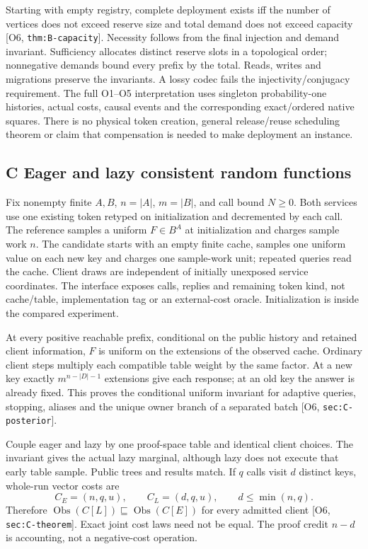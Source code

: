 \documentclass[11pt,a4paper]{article}
\theoremstyle{definition}
\newcommand{\Obs}{\operatorname{Obs}}
\newcommand{\Addr}[2]{\textup{[#1, \texttt{#2}]}}
\begin{document}
Starting with empty registry, complete deployment exists iff the number
of vertices does not exceed reserve size and total demand does not exceed
capacity \Addr{O6}{thm:B-capacity}. Necessity follows from the final
injection and demand invariant. Sufficiency allocates distinct reserve
slots in a topological order; nonnegative demands bound every prefix by
the total. Reads, writes and migrations preserve the invariants. A lossy
codec fails the injectivity/conjugacy requirement. The full O1--O5
interpretation uses singleton probability-one histories, actual costs,
causal events and the corresponding exact/ordered native squares. There
is no physical token creation, general release/reuse scheduling theorem
or claim that compensation is needed to make deployment an instance.

\subsection{C Eager and lazy consistent random functions}
Fix nonempty finite \(A,B\), \(n=|A|\), \(m=|B|\), and call bound
\(N\ge0\). Both services use one existing token retyped on initialization
and decremented by each call. The reference samples a uniform
\(F\in B^A\) at initialization and charges sample work \(n\). The
candidate starts with an empty finite cache, samples one uniform value
on each new key and charges one sample-work unit; repeated queries read
the cache. Client draws are independent of initially unexposed service
coordinates. The interface exposes calls, replies and remaining token
kind, not cache/table, implementation tag or an external-cost oracle.
Initialization is inside the compared experiment.

At every positive reachable prefix, conditional on the public history
and retained client information, \(F\) is uniform on the extensions of
the observed cache. Ordinary client steps multiply each compatible table
weight by the same factor. At a new key exactly
\(m^{n-|D|-1}\) extensions give each response; at an old key the answer
is already fixed. This proves the conditional uniform invariant for
adaptive queries, stopping, aliases and the unique owner branch of a
separated batch \Addr{O6}{sec:C-posterior}.

Couple eager and lazy by one proof-space table and identical client
choices. The invariant gives the actual lazy marginal, although lazy
does not execute that early table sample. Public trees and results match.
If \(q\) calls visit \(d\) distinct keys, whole-run vector costs are
\[
 C_E=(n,q,u),\qquad C_L=(d,q,u),\qquad d\le\min(n,q).
\]
Therefore \(\Obs(C[L])\sqsubseteq\Obs(C[E])\) for every admitted
client \Addr{O6}{sec:C-theorem}. Exact joint cost laws need not be equal.
The proof credit \(n-d\) is accounting, not a negative-cost operation.
\end{document}
